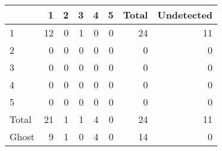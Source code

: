 \begin{tabular}{lrrrrrrr}
\toprule
 & 1 & 2 & 3 & 4 & 5 & Total & Undetected \\
\midrule
1 & 12 & 0 & 1 & 0 & 0 & 24 & 11 \\
2 & 0 & 0 & 0 & 0 & 0 & 0 & 0 \\
3 & 0 & 0 & 0 & 0 & 0 & 0 & 0 \\
4 & 0 & 0 & 0 & 0 & 0 & 0 & 0 \\
5 & 0 & 0 & 0 & 0 & 0 & 0 & 0 \\
Total & 21 & 1 & 1 & 4 & 0 & 24 & 11 \\
Ghost & 9 & 1 & 0 & 4 & 0 & 14 & 0 \\
\bottomrule
\end{tabular}
